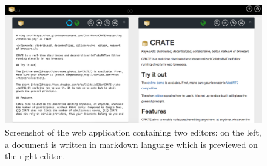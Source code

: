 \begin{figure}
  \includegraphics[width=\textwidth]{./img/screenshot.png}
  \caption{\label{img:screenshot} Screenshot of the web application containing
    two editors: on the left, a document is written in markdown language which
    is previewed on the right editor.}
\end{figure}


